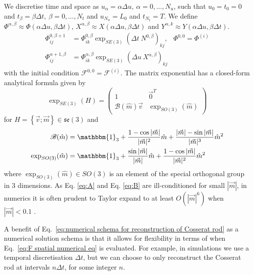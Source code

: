 \documentclass[]{cam-thesis}
\begin{document}
We discretise time and space as $u_{\alpha}=\alpha\Delta u,\ \alpha=0,\dots,N_{u}$, such that $u_{0}=t_{0}=0$ and $t_{\beta}=\beta\Delta t,\ \beta=0,\dots,N_{t}$
and $u_{N_{u}}=L_{0}$ and $t_{N_{t}}=T$. We define $\Phi^{\alpha,\beta}\approx \Phi(\alpha\Delta u,\beta\Delta t)$,
$X^{\alpha,\beta}\approx X(\alpha\Delta u,\beta\Delta t)$ and $Y^{\alpha,k}\approx Y(\alpha\Delta u,\beta\Delta t)$.
\begin{subequations} \label{eq:numerical schema for reconstruction of Cosserat rod}
\begin{align}
\Phi_{ij}^{0, \beta+1} & = \Phi_{ik}^{0, \beta} \exp_{SE(3)} \left(\Delta t\ N^{0, \beta}\right)_{kj}, & \Phi^{0,0}=\Phi^{(i)}\\
\Phi_{ij}^{\alpha+1, \beta} & = \Phi_{ik}^{\alpha, \beta}\exp_{SE(3)}  \left(\Delta u\ X^{\alpha,\beta}\right)_{kj} \label{eq:F spatial numerical eq}
\end{align}
\end{subequations}
with the initial condition $\mathcal{F}^{0,0}=\mathcal{F}^{(i)}$.
The matrix exponential has a closed-form analytical formula given
by
\begin{equation}
\exp_{SE(3)}  (H)=\left(\begin{array}{cc}
1 & \vec{0}^{T}\\
\mathscr{B}(\hat{m}) \vec{v} & \exp_{SO(3)}(\hat{m})
\end{array}\right)
\end{equation}
for $H=\left\{ \vec{v};\vec{m}\right\} \in\mathfrak{se}(3)$ and
\begin{subequations} 
\begin{align}
\mathscr{B}(\hat{m}) & =\mathbbm{1}_{3}+\frac{1-\cos|\vec{m}|}{|\vec{m}|^{2}}\hat{m}+\frac{|\vec{m}|-\sin|\vec{m}|}{|\vec{m}|^{3}}\hat{m}^{2}\label{eq:A}\\
\exp_{SO(3)} (\hat{m}) & =\mathbbm{1}_{3}+\frac{\sin|\vec{m}|}{|\vec{m}|}\hat{m}+\frac{1-\cos|\vec{m}|}{|\vec{m}|^{2}}\hat{m}^{2}\label{eq:B}
\end{align}
\end{subequations}
where $\exp_{SO(3)} (\hat{m}) \in SO(3)$ is an element of the special orthogonal
group in 3 dimensions. As Eq. \ref{eq:A} and Eq. \ref{eq:B} are
ill-conditioned for small $|\vec{m}|$, in numerics it is often prudent
to Taylor expand to at least $O(|\vec{m}|^6)$ when $|\vec{m}| < 0.1$ \citep{giusteriSimulationViscoelasticCosserat2021}.

A benefit of Eq.~\ref{eq:numerical schema for reconstruction of Cosserat rod} as a numerical solution schema is that it allows for flexibility in terms of when Eq.~\ref{eq:F spatial numerical eq} is evaluated. For example, in simulations we use a temporal discretisation $\Delta t$, but we can choose to only reconstruct the Cosserat rod at intervals $n \Delta t$, for some integer $n$.
\end{document}
